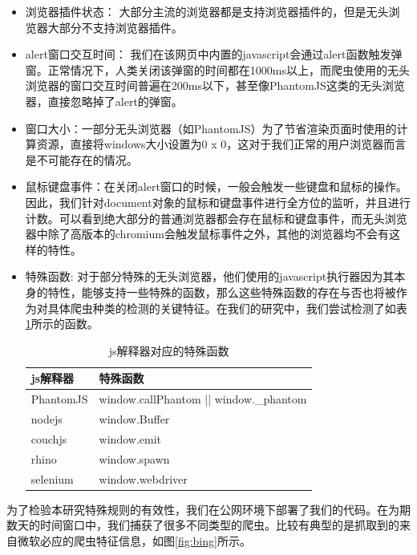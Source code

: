 \documentclass[doctor,privacy,twoside]{buaa_mac}
\begin{document}
\begin{itemize}
\item[(1)] 浏览器插件状态： 大部分主流的浏览器都是支持浏览器插件的，但是无头浏览器大部分不支持浏览器插件。
\item[(2)] alert窗口交互时间： 我们在该网页中内置的javascript会通过alert函数触发弹窗。正常情况下，人类关闭该弹窗的时间都在1000ms以上，而爬虫使用的无头浏览器的窗口交互时间普遍在200ms以下，甚至像PhantomJS这类的无头浏览器，直接忽略掉了alert的弹窗。
\item[(3)] 窗口大小：一部分无头浏览器（如PhantomJS）为了节省渲染页面时使用的计算资源，直接将windows大小设置为0 x 0，这对于我们正常的用户浏览器而言是不可能存在的情况。
\item[(4)] 鼠标键盘事件：在关闭alert窗口的时候，一般会触发一些键盘和鼠标的操作。因此，我们针对document对象的鼠标和键盘事件进行全方位的监听，并且进行计数。可以看到绝大部分的普通浏览器都会存在鼠标和键盘事件，而无头浏览器中除了高版本的chromium会触发鼠标事件之外，其他的浏览器均不会有这样的特性。
\item[(5)] 特殊函数: 对于部分特殊的无头浏览器，他们使用的javascript执行器因为其本身的特性，能够支持一些特殊的函数，那么这些特殊函数的存在与否也将被作为对具体爬虫种类的检测的关键特征。在我们的研究中，我们尝试检测了如表\ref{tab:special-function}所示的函数。

\centerline{}
\begin{table}[h]
  \caption{js解释器对应的特殊函数}
  \label{tab:special-function}
  \centering
\begin{tabular}{|p{3cm}<{\centering}|p{8cm}<{\centering}|}
    \hline
   js解释器 &  特殊函数   \\
    \hline
PhantomJS &  window.callPhantom || window.\_{}phantom \\
\hline
nodejs & window.Buffer \\
\hline
couchjs & window.emit  \\
\hline
rhino & window.spawn \\
\hline
selenium & window.webdriver \\
\hline
    \end{tabular}
\end{table}
\centerline{}

\end{itemize}


为了检验本研究特殊规则的有效性，我们在公网环境下部署了我们的代码。在为期数天的时间窗口中，我们捕获了很多不同类型的爬虫。比较有典型的是抓取到的来自微软必应的爬虫特征信息，如图\ref{fig:bing}所示。
\end{document}
